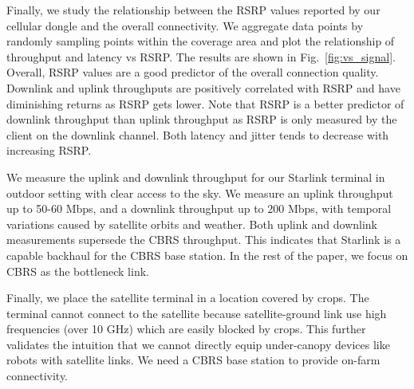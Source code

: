  Finally, we study the relationship between the RSRP values reported by our cellular dongle and the overall connectivity. We aggregate data points by randomly sampling points within the coverage area and plot the relationship of throughput and latency vs RSRP. The results are shown in Fig.~\ref{fig:vs_signal}. Overall, RSRP values are a good predictor of the overall connection quality. Downlink and uplink throughputs are positively correlated with RSRP and have diminishing returns as RSRP gets lower. Note that RSRP is a better predictor of downlink throughput than uplink throughput as RSRP is only measured by the client on the downlink channel. Both latency and jitter tends to decrease with increasing RSRP.

We measure the uplink and downlink throughput for our Starlink terminal in outdoor setting with clear access to the sky. We measure an uplink throughput up to 50-60 Mbps, and a downlink throughput up to 200 Mbps, with temporal variations caused by satellite orbits and weather. Both uplink and downlink measurements supersede the CBRS throughput. This indicates that Starlink is a capable backhaul for the CBRS base station. In the rest of the paper, we focus on CBRS as the bottleneck link.

Finally, we place the satellite terminal in a location covered by crops. The terminal cannot connect to the satellite because satellite-ground link use high frequencies (over 10 GHz) which are easily blocked by crops. This further validates the intuition that we cannot directly equip under-canopy devices like robots with satellite links. We need a CBRS base station to provide on-farm connectivity.


